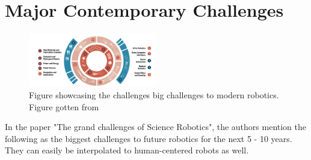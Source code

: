 \documentclass[conference]{IEEEtran}
\begin{document}
\section{Major Contemporary Challenges}
\begin{figure}[h]
    \centerline{\includegraphics[width=0.5\textwidth]{images/grand_challenges.png}}
    \caption{Figure showcasing the challenges big challenges to modern robotics. Figure gotten from\autocite{yang2018grand}}
\label{fig3}
\end{figure}
In the paper "The grand challenges of Science Robotics", the authors \textcite{yang2018grand} mention the following as the biggest challenges to future robotics for the next 5 - 10 years. They can easily be interpolated to human-centered robots as well.
\end{document}
